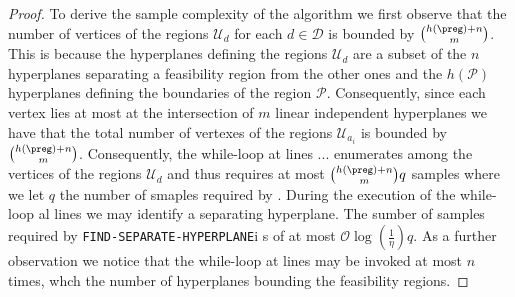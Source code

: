 \begin{proof}
	
	To derive the sample complexity of the algorithm we first observe that the number of vertices of the regions $\mathcal{U}_{d}$ for each $d \in \mathcal{D}$ is bounded by $\binom{h(\preg) + n}{m} $. This is because the hyperplanes defining the regions $\mathcal{U}_{d}$ are a subset of the $n$ hyperplanes separating a feasibility region from the other ones and the $h(\mathcal{P})$ hyperplanes defining the boundaries of the region $\mathcal{P}$. Consequently, since each vertex lies at most at the intersection of $m$ linear independent hyperplanes we have that the total number of vertexes of the regions $\mathcal{U}_{a_i}$ is bounded by $\binom{h(\preg)+ n}{m} $. Consequently, the while-loop at lines ... enumerates among the vertices of the regions $\mathcal{U}_d$ and thus requires at most $\binom{h(\preg)+ n}{m} q $ samples where we let $q$ the number of smaples required by \ActionOracle. During the execution of the while-loop al lines we may identify a separating hyperplane. The sumber of samples required by \texttt{FIND-SEPARATE-HYPERPLANE}i s of at most $\mathcal{O} \log \left(  \frac{1}{\eta}\right) q $. As a further observation we notice that the while-loop at lines may be invoked at most $n$ times, whch the number of hyperplanes bounding the feasibility regions.
\end{proof}

